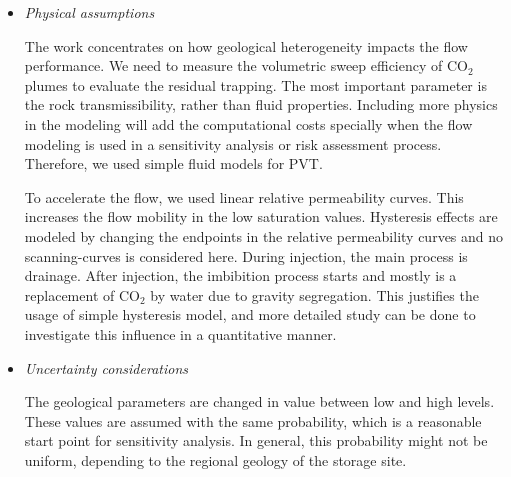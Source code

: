 {\begin{itemize}
This paper is presented in ECMOR conference in Oxford, 2010. This is a
complementary to proceedings works presented in ACM Edinburgh, 2009 and CMWR in
Barcelona, 2010. 

Topography is a major player in the gravity dominated flow behavior. The SAIGUP
realizations include variability in topography of the geological layering via
structural changes due to faults and also barriers in the model. These are good
enough for early migration when the $\mbox{CO}_2$ and water segregate and plumes
accumulate below cap-rock and start the longer migration. In the long-term
migration, top surface geometry is an important geological parameter and
larger models than the SAIGUP models with a better resolution of the top surface
are needed to get good predictions of the long-term migration phase. This
was considered in the next generation of geological studies performed following
this study \cite{syversveenstudy,nilsen2012impact} under the IGEMS research
project.

\item \textit{Physical assumptions}
 
The work concentrates on how geological heterogeneity impacts the flow
performance. We need to measure the volumetric sweep efficiency of $\mbox{CO}_2$
plumes to evaluate the residual trapping. The most important parameter
is the rock transmissibility, rather than fluid properties. Including more
physics in the modeling will add the computational costs specially when the flow
modeling is used in a sensitivity analysis or risk assessment process.
Therefore, we used simple fluid models for PVT. 

To accelerate the flow, we used linear relative permeability curves. This
increases the flow mobility in the low saturation values. Hysteresis effects are
modeled by changing the endpoints in the relative permeability curves and no
scanning-curves is considered here. During injection, the main process is
drainage. After injection, the imbibition process starts and mostly is a
replacement of $\mbox{CO}_2$ by water due to gravity segregation. This justifies
the usage of simple hysteresis model, and more detailed study can be done to
investigate this influence in a quantitative manner. 

\item \textit{Uncertainty considerations}

The geological parameters are changed in value between low and high levels.
These values are assumed with the same probability, which is a reasonable 
start point for sensitivity analysis. In general, this probability might
not be uniform, depending to the regional geology of the storage site.

\end{itemize}
}%


